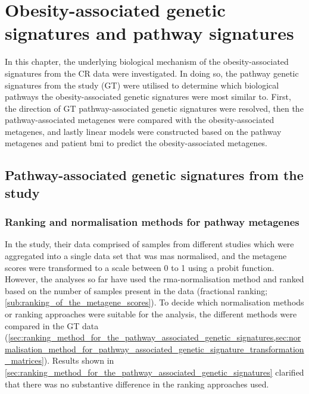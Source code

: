 \chapter{Obesity-associated genetic signatures and pathway signatures}
\label{cha:obesity_associated_genetic_signature_and_pathway_signatures}

In this chapter, the underlying biological mechanism of the obesity-associated signatures from the CR data were investigated.
In doing so, the pathway genetic signatures from the \citet{Gatza2010a} study (GT) were utilised to determine which biological pathways the obesity-associated genetic signatures were most similar to.
First, the direction of GT pathway-associated genetic signatures were resolved, then the pathway-associated metagenes were compared with the obesity-associated metagenes, and lastly linear models were constructed based on the pathway metagenes and patient \gls{bmi} to predict the obesity-associated metagenes.

\vspace{-3mm}

\section{Pathway-associated genetic signatures from the\\\citet{Gatza2010a} study}
\label{sec:pathway_associated_genetic_signatures_from_gatza2010a_study}

\subsection{Ranking and normalisation methods for pathway metagenes}
\label{sub:ranking_and_normalisation_methods}

In the \citet{Gatza2010a} study, their data comprised of samples from different studies which were aggregated into a single data set that was \gls{mas} normalised, and the metagene scores were transformed to a scale between 0 to 1 using a probit function.
However, the analyses so far have used the \gls{rma}-normalisation method and ranked based on the number of samples present in the data (fractional ranking; \cref{sub:ranking_of_the_metagene_scores}).
To decide which normalisation methods or ranking approaches were suitable for the analysis, the different methods were compared in the GT data (\cref{sec:ranking_method_for_the_pathway_associated_genetic_signatures,sec:normalisation_method_for_pathway_associated_genetic_signature_transformation_matrices}).
Results shown in \cref{sec:ranking_method_for_the_pathway_associated_genetic_signatures} clarified that there was no substantive difference in the ranking approaches used.

